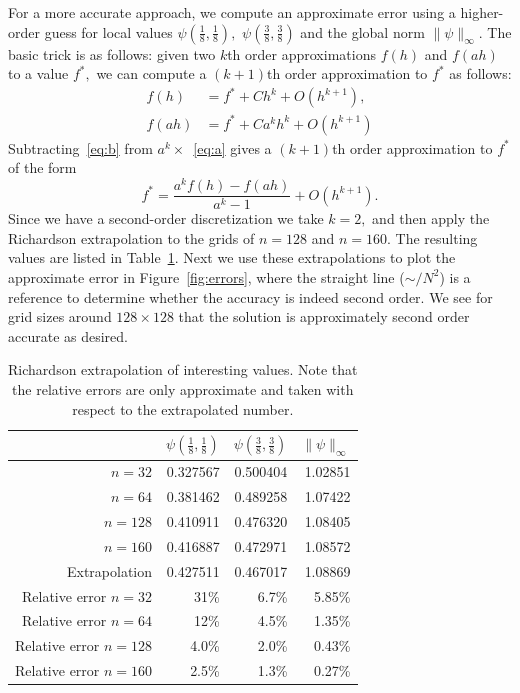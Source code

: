 For a more accurate approach, we compute an approximate error using a higher-order guess for local values $\psi(\tfrac{1}{8}, \tfrac{1}{8}),$ $\psi(\tfrac{3}{8}, \tfrac{3}{8})$ and the global norm $\|\psi\|_\infty.$ The basic trick is as follows: given two $k$th order approximations $f(h)$ and $f(ah)$ to a value $f^*,$ we can compute a $(k+1)$th order approximation to $f^*$ as follows:
\begin{align}
    f(h) &= f^* + C h^k + O(h^{k+1}), \label{eq:a} \\
    f(ah) &= f^* + C a^k h^k + O(h^{k+1}) \label{eq:b}
\end{align}
Subtracting~\eqref{eq:b} from $a^k \times$~\eqref{eq:a} gives a $(k+1)$th order approximation to $f^*$ of the form
\begin{equation}
    f^* = \frac{a^k f(h) - f(ah)}{a^k - 1} + O(h^{k+1}).
\end{equation}
Since we have a second-order discretization we take $k = 2,$ and then apply the Richardson extrapolation to the grids of $n = 128$ and $n = 160.$ The resulting values are listed in Table~\ref{table:extrap}. Next we use these extrapolations to plot the approximate error in Figure~\ref{fig:errors}, where the straight line ($\sim/N^2$) is a reference to determine whether the accuracy is indeed second order. We see for grid sizes around $128 \times 128$ that the solution is approximately second order accurate as desired.

\begin{table}[t]\centering
{}
\begin{tabular}{@{}rrrr@{}}\toprule
  & $\psi(\tfrac{1}{8}, \tfrac{1}{8})$ & $\psi(\tfrac{3}{8}, \tfrac{3}{8})$ & $\|\psi\|_\infty$\\ \midrule 
$n = 32$                 & 0.327567 & 0.500404 & 1.02851\\
$n = 64$                 & 0.381462 & 0.489258 & 1.07422\\
$n = 128$                & 0.410911 & 0.476320 & 1.08405\\
$n = 160$                & 0.416887 & 0.472971 & 1.08572\\ \midrule
Extrapolation      & 0.427511 & 0.467017 & 1.08869\\ \midrule
Relative error $n = 32$  & 31\%     & 6.7\%    & 5.85\% \\
Relative error $n = 64$  & 12\%     & 4.5\%    & 1.35\% \\
Relative error $n = 128$ & 4.0\%    & 2.0\%    & 0.43\% \\
Relative error $n = 160$ & 2.5\%    & 1.3\%    & 0.27\% \\
\bottomrule
\end{tabular}
\caption{Richardson extrapolation of interesting values. Note that the relative errors are only approximate and taken with respect to the extrapolated number.}\label{table:extrap}
\end{table}


